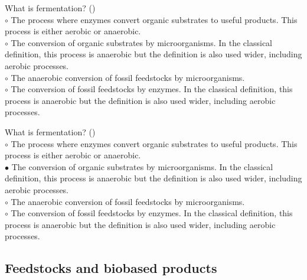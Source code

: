 \documentclass[]{beamer}
\begin{document}
\begin{CJK}{UTF8}{gbsn}
\begin{frame}[shrink] {}
\addtocounter{questions}{1}
\color{blue}
What is fermentation?
({})\\
\color{black}
\setlength{\parindent}{-0.4cm}
{\color{red}$\circ$} The process where enzymes convert organic substrates to useful products. This process is either aerobic or anaerobic.  \\
{\color{red}$\circ$}  The conversion of organic substrates by microorganisms. In the classical definition, this process is anaerobic but the definition is also used wider, including aerobic processes.  \\
{\color{red}$\circ$} The anaerobic conversion of fossil feedstocks by microorganisms.  \\
{\color{red}$\circ$} The conversion of fossil feedstocks by enzymes. In the classical definition, this process is anaerobic but the definition is also used wider, including aerobic processes.  \\

\end{frame}
\begin{frame}[shrink] {}
\addtocounter{answers}{1}
\color{blue}
What is fermentation?
({})\\
\color{black}
\setlength{\parindent}{-0.4cm}
{\color{red}$\circ$} The process where enzymes convert organic substrates to useful products. This process is either aerobic or anaerobic.  \\
{\color{red}$\bullet$} The conversion of organic substrates by microorganisms. In the classical definition, this process is anaerobic but the definition is also used wider, including aerobic processes.  \\
{\color{red}$\circ$} The anaerobic conversion of fossil feedstocks by microorganisms.  \\
{\color{red}$\circ$} The conversion of fossil feedstocks by enzymes. In the classical definition, this process is anaerobic but the definition is also used wider, including aerobic processes.  \\

\end{frame}
\subsection{Feedstocks and biobased products }
\setcounter{questions}{0}
\setcounter{answers}{0}



\end{CJK}
\end{document}
